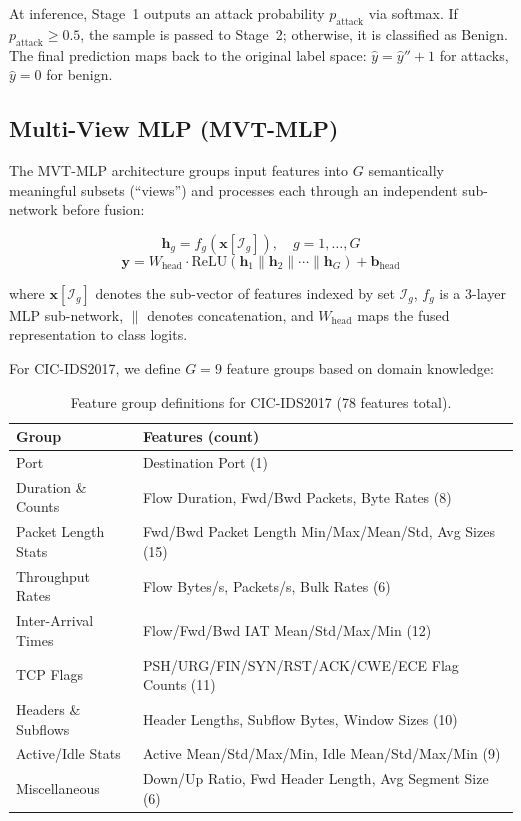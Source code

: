\documentclass[12pt]{article}
\begin{document}
At inference, Stage~1 outputs an attack probability $p_{\text{attack}}$ via softmax. If $p_{\text{attack}} \geq 0.5$, the sample is passed to Stage~2; otherwise, it is classified as Benign. The final prediction maps back to the original label space: $\hat{y} = \hat{y}'' + 1$ for attacks, $\hat{y} = 0$ for benign.

\subsection{Multi-View MLP (MVT-MLP)}
\label{subsec:mvt}

The MVT-MLP architecture groups input features into $G$ semantically meaningful subsets (``views'') and processes each through an independent sub-network before fusion:

\begin{equation}
    \mathbf{h}_g = f_g(\mathbf{x}[\mathcal{I}_g]), \quad g = 1, \ldots, G
\end{equation}
\begin{equation}
    \mathbf{y} = W_{\text{head}} \cdot \text{ReLU}(\mathbf{h}_1 \| \mathbf{h}_2 \| \cdots \| \mathbf{h}_G) + \mathbf{b}_{\text{head}}
\end{equation}

\noindent where $\mathbf{x}[\mathcal{I}_g]$ denotes the sub-vector of features indexed by set $\mathcal{I}_g$, $f_g$ is a 3-layer MLP sub-network, $\|$ denotes concatenation, and $W_{\text{head}}$ maps the fused representation to class logits.

For CIC-IDS2017, we define $G=9$ feature groups based on domain knowledge:

\begin{table}[h]
\centering
\small
\caption{Feature group definitions for CIC-IDS2017 (78 features total).}
\label{tab:feature_groups}
\begin{tabular}{ll}
\toprule
\textbf{Group} & \textbf{Features (count)} \\
\midrule
Port & Destination Port (1) \\
Duration \& Counts & Flow Duration, Fwd/Bwd Packets, Byte Rates (8) \\
Packet Length Stats & Fwd/Bwd Packet Length Min/Max/Mean/Std, Avg Sizes (15) \\
Throughput Rates & Flow Bytes/s, Packets/s, Bulk Rates (6) \\
Inter-Arrival Times & Flow/Fwd/Bwd IAT Mean/Std/Max/Min (12) \\
TCP Flags & PSH/URG/FIN/SYN/RST/ACK/CWE/ECE Flag Counts (11) \\
Headers \& Subflows & Header Lengths, Subflow Bytes, Window Sizes (10) \\
Active/Idle Stats & Active Mean/Std/Max/Min, Idle Mean/Std/Max/Min (9) \\
Miscellaneous & Down/Up Ratio, Fwd Header Length, Avg Segment Size (6) \\
\bottomrule
\end{tabular}
\end{table}
\end{document}
